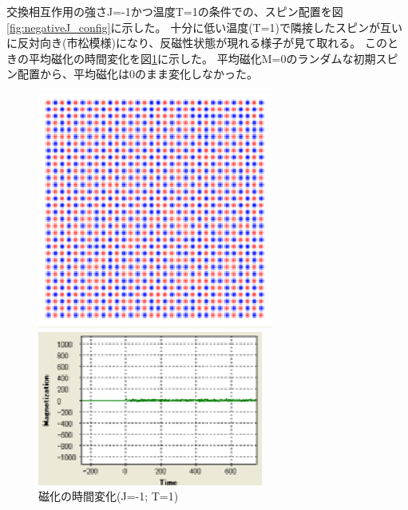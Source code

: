 \documentclass[11pt,a4]{jarticle}
\begin{document}
交換相互作用の強さJ=-1かつ温度T=1の条件での、スピン配置を図\ref{fig:negativeJ_config}に示した。
十分に低い温度(T=1)で隣接したスピンが互いに反対向き(市松模様)になり、反磁性状態が現れる様子が見て取れる。
このときの平均磁化の時間変化を図\ref{fig:negativeJ_transition}に示した。
平均磁化M=0のランダムな初期スピン配置から、平均磁化は0のまま変化しなかった。
\begin{figure}[htbp]
 \begin{minipage}{0.45\hsize}
  \begin{center}
   \includegraphics[width=0.9\hsize]{negativeJ_config.eps}
  \end{center}
  \caption{スピン配置(J=-1; T=1)}
  \label{fig:negativeJ_config}
 \end{minipage}
 \begin{minipage}{0.55\hsize}
  \begin{center}
   \includegraphics[width=0.9\hsize]{negativeJ_transition.eps}
  \end{center}
  \caption{磁化の時間変化(J=-1; T=1)}
  \label{fig:negativeJ_transition}
 \end{minipage}
\end{figure}
\end{document}
